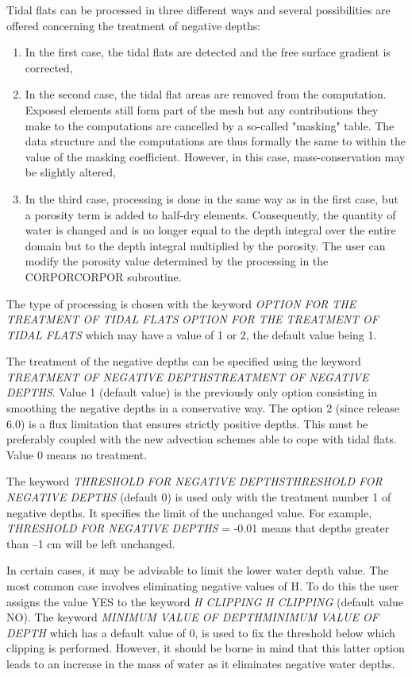 \documentclass{article} %
\begin{document}
 Tidal flats can be processed in three different ways and several possibilities are offered concerning the treatment of negative depths:

\begin{enumerate}
\item  In the first case, the tidal flats are detected and the free surface gradient is corrected,

\item  In the second case, the tidal flat areas are removed from the computation. Exposed elements still form part of the mesh but any contributions they make to the computations are cancelled by a so-called "masking" table. The data structure and the computations are thus formally the same to within the value of the masking coefficient. However, in this case, mass-conservation may be slightly altered,

\item  In the third case, processing is done in the same way as in the first case, but a porosity term is added to half-dry elements. Consequently, the quantity of water is changed and is no longer equal to the depth integral over the entire domain but to the depth integral multiplied by the porosity. The user can modify the porosity value determined by the processing in the CORPORCORPOR subroutine.
\end{enumerate}

 The type of processing is chosen with the keyword \textit{OPTION FOR THE TREATMENT OF TIDAL FLATS} \textit{OPTION FOR THE TREATMENT OF TIDAL FLATS}  which may have a value of 1 or 2, the default value being 1.

 The treatment of the negative depths can be specified using the keyword \textit{TREATMENT OF NEGATIVE DEPTHSTREATMENT OF NEGATIVE DEPTHS}. Value 1 (default value) is the previously only option consisting in smoothing the negative depths in a conservative way. The option 2 (since release 6.0) is a flux limitation that ensures strictly positive depths. This must be preferably coupled with the new advection schemes able to cope with tidal flats. Value 0 means no treatment.

 The keyword \textit{THRESHOLD FOR NEGATIVE DEPTHSTHRESHOLD FOR NEGATIVE DEPTHS} (default 0) is used only with the treatment number 1 of negative depths. It specifies the limit of the unchanged value. For example, \textit{THRESHOLD FOR NEGATIVE DEPTHS} = -0.01 means that depths greater than --1 cm will be left unchanged.

 In certain cases, it may be advisable to limit the lower water depth value. The most common case involves eliminating negative values of H. To do this the user assigns the value YES to the keyword \textit{H CLIPPING} \textit{H CLIPPING} (default value NO). The keyword \textit{MINIMUM VALUE OF DEPTHMINIMUM VALUE OF DEPTH} which has a default value of 0, is used to fix the threshold below which clipping is performed. However, it should be borne in mind that this latter option leads to an increase in the mass of water as it eliminates negative water depths.
\end{document}
